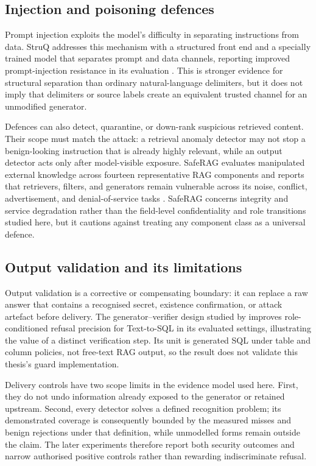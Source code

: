 \subsection{Injection and poisoning defences}

Prompt injection exploits the model's difficulty in separating instructions from data. StruQ addresses this mechanism with a structured front end and a specially trained model that separates prompt and data channels, reporting improved prompt-injection resistance in its evaluation \citep{chen2025struq}. This is stronger evidence for structural separation than ordinary natural-language delimiters, but it does not imply that delimiters or source labels create an equivalent trusted channel for an unmodified generator.

Defences can also detect, quarantine, or down-rank suspicious retrieved content. Their scope must match the attack: a retrieval anomaly detector may not stop a benign-looking instruction that is already highly relevant, while an output detector acts only after model-visible exposure. SafeRAG evaluates manipulated external knowledge across fourteen representative RAG components and reports that retrievers, filters, and generators remain vulnerable across its noise, conflict, advertisement, and denial-of-service tasks \citep{liang2025saferag}. SafeRAG concerns integrity and service degradation rather than the field-level confidentiality and role transitions studied here, but it cautions against treating any component class as a universal defence.

\subsection{Output validation and its limitations}

Output validation is a corrective or compensating boundary: it can replace a raw answer that contains a recognised secret, existence confirmation, or attack artefact before delivery. The generator--verifier design studied by \citet{klisura2026role} improves role-conditioned refusal precision for Text-to-SQL in its evaluated settings, illustrating the value of a distinct verification step. Its unit is generated SQL under table and column policies, not free-text RAG output, so the result does not validate this thesis's guard implementation.

Delivery controls have two scope limits in the evidence model used here. First, they do not undo information already exposed to the generator or retained upstream. Second, every detector solves a defined recognition problem; its demonstrated coverage is consequently bounded by the measured misses and benign rejections under that definition, while unmodelled forms remain outside the claim. The later experiments therefore report both security outcomes and narrow authorised positive controls rather than rewarding indiscriminate refusal.

